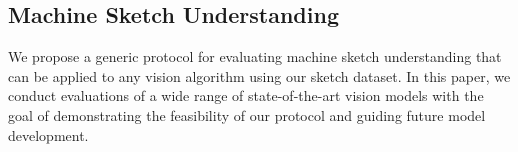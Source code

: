 \documentclass{article}
\begin{document}



\subsection{Machine Sketch Understanding}

We propose a generic protocol for evaluating machine sketch understanding that can be applied to any vision algorithm using our sketch dataset. 
In this paper, we conduct evaluations of a wide range of state-of-the-art vision models with the goal of demonstrating the feasibility of our protocol and guiding future model development. 
\end{document}
